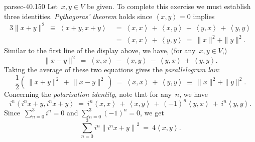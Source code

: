 \documentclass[b5page]{book}
\begin{document}
\begin{solution}{parsec-40.150}
Let~$x,y\in V$ be given.
To complete this exercise we must establish three
identities.
\emph{Pythagoras' theorem}
holds since $\left<x,y\right>=0$ implies
\begin{alignat*}{3}
\|x+y\|^2\ \equiv  \ \left<x+y,x+y\right>
    \ &=\ 
\left<x,x\right>
\,+\, \left<x,y\right>
\,+\, \left<y,x\right>
\,+\, \left<y,y\right>\\
    \ &=\  
\left<x,x\right>\,+\,\left<y,y\right>
\ = \ \|x\|^2 + \|y\|^2.
\end{alignat*}
Similar to the first line of the display above, we have,
(for any~$x,y\in V$,)
\begin{equation*}
\|x-y\|^2\ =\ 
\left<x,x\right>
\,-\, \left<x,y\right>
\,-\, \left<y,x\right>
\,+\, \left<y,y\right>.
\end{equation*}
Taking the average of these two equations gives the \emph{parallelogram law}:
\begin{equation*}
    \textstyle \frac{1}{2}(\ \|x+y\|^2\,+\,\|x-y\|^2\ )
    \ =\ 
\left<x,x\right>
\,+\, \left<y,y\right>\ \equiv\ 
\|x\|^2 + \|y\|^2.
\end{equation*}
Concerning the \emph{polarisation identity},
note that for any~$n$, we have
\begin{equation*}
i^n\left<i^nx+y,i^nx+y\right>
\ = \ i^n\left<x,x\right>
\,+\, \left<x,y\right>
    \,+\, (-1)^n\left<y,x\right>
    \,+\, i^n\left<y,y\right>.
\end{equation*}
Since~$\sum_{n=0}^3 i^n = 0$
and $\sum_{n=0}^3 (-1)^n=0$,
we get 
\begin{equation*}
    \textstyle
    \sum_{n=0}^3i^n\left\|i^nx+y\right\|^2
\ = \ 4\left<x,y\right>.
\end{equation*}
\end{solution}
\end{document}
